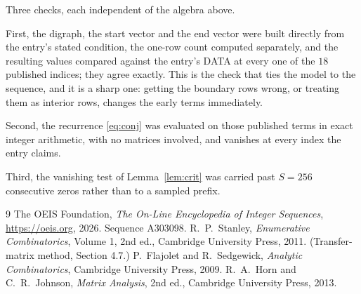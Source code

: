\documentclass[11pt,a4paper]{article}
\theoremstyle{plain}
\theoremstyle{definition}
\begin{document}
Three checks, each independent of the algebra above.

First, the digraph, the start vector and the end vector were built directly from the
entry's stated condition, the one-row count computed separately, and the resulting values
compared against the entry's DATA at every one of the $18$ published indices; they
agree exactly. This is the check that ties the model to the sequence, and it is a sharp one:
getting the boundary rows wrong, or treating them as interior rows, changes the early terms
immediately.

Second, the recurrence \eqref{eq:conj} was evaluated on those published terms in exact
integer arithmetic, with no matrices involved, and vanishes at every index the entry claims.

Third, the vanishing test of Lemma~\ref{lem:crit} was carried past $S=256$ consecutive
zeros rather than to a sampled prefix.

\begin{thebibliography}{9}
 The OEIS Foundation, \emph{The On-Line Encyclopedia of Integer
Sequences}, \url{https://oeis.org}, 2026. Sequence A303098.
 R.~P.~Stanley, \emph{Enumerative Combinatorics}, Volume 1, 2nd ed.,
Cambridge University Press, 2011. (Transfer-matrix method, Section 4.7.)
 P.~Flajolet and R.~Sedgewick, \emph{Analytic Combinatorics}, Cambridge
University Press, 2009.
 R.~A.~Horn and C.~R.~Johnson, \emph{Matrix Analysis}, 2nd ed., Cambridge
University Press, 2013.
\end{thebibliography}
\end{document}
